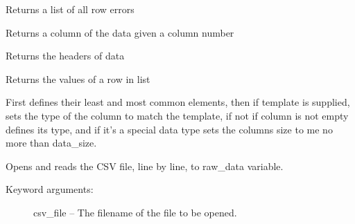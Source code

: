 \documentclass[letterpaper,10pt,english]{sphinxmanual}
\begin{document}
\begin{fulllineitems}

\begin{fulllineitems}
\label{Code_rst/dat:data.Data.getRowErrors}
Returns a list of all row errors

\end{fulllineitems}


\begin{fulllineitems}
\label{Code_rst/dat:data.Data.get_column}
Returns a column of the data given a column number

\end{fulllineitems}


\begin{fulllineitems}
\label{Code_rst/dat:data.Data.get_headers}
Returns the headers of data

\end{fulllineitems}


\begin{fulllineitems}
\label{Code_rst/dat:data.Data.get_row}
Returns the values of a row in list

\end{fulllineitems}


\begin{fulllineitems}
\label{Code_rst/dat:data.Data.pre_analysis}
First defines their least and most common elements, then if 
template is supplied, sets the type of the column to match the template, if not if 
column is not empty defines its type, and if it's a special data type sets the columns
size to me no more than data\_size.

\end{fulllineitems}


\begin{fulllineitems}
\label{Code_rst/dat:data.Data.read}
Opens and reads the CSV file, line by line, to raw\_data variable.
\begin{description}
\item[{Keyword arguments:}] \leavevmode
csv\_file -- The filename of the file to be opened.


\end{description}
\end{fulllineitems}
\end{fulllineitems}
\end{document}
